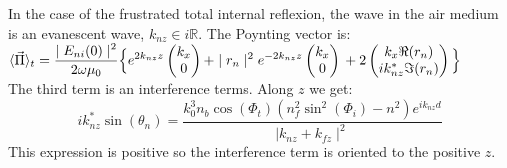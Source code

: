 In the case of the frustrated total internal reflexion, the wave in the air medium is an evanescent wave, $k_{nz} \in i\mathbb{R}$. The Poynting vector is:\\
$
\langle \vec{\Pi} \rangle _t =\displaystyle\frac{\displaystyle\mid E_{ni}(0)\mid ^2}{\displaystyle2\omega \mu_0}\Big\{
e^{2k_{nz}z}
\begin{pmatrix}
k_x\\
0
\end{pmatrix}
+\mid r_n\mid ^2e^{-2k_{nz}z}
\begin{pmatrix}
k_x\\
0
\end{pmatrix}\\
+2
\begin{pmatrix}
k_x\Re(r_n)\\
ik_{nz}^*\Im(r_n)
\end{pmatrix}
\Big\}
$\\
The third term is an interference terms. Along $z$ we get:\\
$$
ik_{nz}^*\sin(\theta _n) =\frac{ k_0^3n_b\cos(\Phi _t)(n_f^2\sin ^2(\Phi _i)-n^2)e^{ik_{nz}d}}{\mid k_{nz}+k_{fz}\mid ^2}
$$
This expression is positive so the interference term is oriented to the positive $z$.
